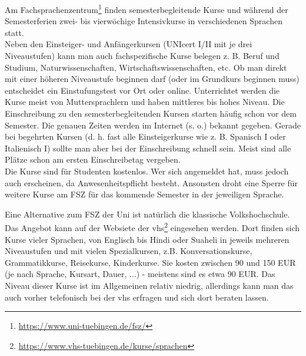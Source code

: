 Am Fachsprachenzentrum\footnote{\url{https://www.uni-tuebingen.de/fsz/}} finden semesterbegleitende Kurse und während der Semesterferien zwei- bis vierwöchige Intensivkurse in verschiedenen Sprachen statt.\\
Neben den Einsteiger- und Anfängerkursen (UNIcert I/II mit je drei Niveaustufen) kann man auch fachspezifische Kurse belegen z. B. Beruf und Studium, Naturwissenschaften, Wirtschaftswissenschaften, etc.  Ob man direkt mit einer höheren Niveaustufe beginnen darf (oder im Grundkurs beginnen muss) entscheidet ein Einstufungstest vor Ort oder online.  Unterrichtet werden die Kurse meist von Muttersprachlern und haben mittleres bis hohes Niveau.
Die Einschreibung zu den semesterbegleitenden Kursen starten häufig schon vor dem Semester. Die genauen Zeiten werden im Internet (s. o.) bekannt gegeben.  Gerade bei begehrten Kursen (d. h. fast alle Einsteigerkurse wie z. B. Spanisch I oder Italienisch I) sollte man aber bei der  Einschreibung schnell sein. Meist sind alle Plätze schon am ersten Einschreibetag vergeben.\\
Die Kurse sind für Studenten kostenlos. Wer sich angemeldet hat, muss jedoch auch erscheinen, da Anwesenheitspflicht besteht. Ansonsten droht eine Sperre für weitere Kurse am FSZ für das kommende Semester in der jeweiligen Sprache.
  
Eine Alternative zum FSZ der Uni ist natürlich die klassische Volkshochschule. Das Angebot kann auf der Websiete der vhs\footnote{\url{https://www.vhs-tuebingen.de/kurse/sprachen}} eingesehen werden. Dort finden sich Kurse vieler Sprachen, von Englisch bis Hindi oder Suaheli in jeweils mehreren Niveaustufen und mit vielen Spezialkursen, z.B. Konversationskurse, Grammatikkurse, Reisekurse, Kinderkurse. Sie kosten zwischen 90 und 150 EUR (je nach Sprache, Kursart, Dauer, ...) - meistens sind es etwa 90 EUR. Das Niveau dieser Kurse ist im Allgemeinen relativ niedrig, allerdings kann man das auch vorher telefonisch bei der vhs erfragen und sich dort beraten lassen.

\vfill
